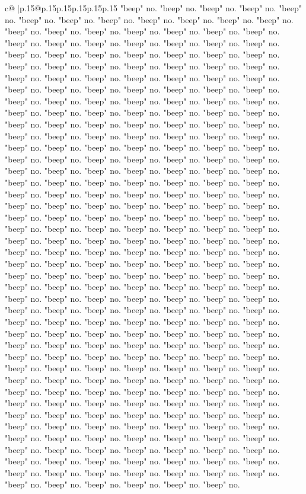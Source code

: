 \documentclass{article}
\begin{document}
{\begin{supertabular}{c@{$\;$}|p{.15\linewidth}@{}p{.15\linewidth}p{.15\linewidth}p{.15\linewidth}p{.15\linewidth}p{.15\linewidth}}
{{{"beep" no. "beep" no. "beep" no. "beep" no. "beep" no. "beep" no. "beep" no. "beep" no. "beep" no. "beep" no. "beep" no. "beep" no. "beep" no. "beep" no. "beep" no. "beep" no. "beep" no. "beep" no. "beep" no. "beep" no. "beep" no. "beep" no. "beep" no. "beep" no. "beep" no. "beep" no. "beep" no. "beep" no. "beep" no. "beep" no. "beep" no. "beep" no. "beep" no. "beep" no. "beep" no. "beep" no. "beep" no. "beep" no. "beep" no. "beep" no. "beep" no. "beep" no. "beep" no. "beep" no. "beep" no. "beep" no. "beep" no. "beep" no. "beep" no. "beep" no. "beep" no. "beep" no. "beep" no. "beep" no. "beep" no. "beep" no. "beep" no. "beep" no. "beep" no. "beep" no. "beep" no. "beep" no. "beep" no. "beep" no. "beep" no. "beep" no. "beep" no. "beep" no. "beep" no. "beep" no. "beep" no. "beep" no. "beep" no. "beep" no. "beep" no. "beep" no. "beep" no. "beep" no. "beep" no. "beep" no. "beep" no. "beep" no. "beep" no. "beep" no. "beep" no. "beep" no. "beep" no. "beep" no. "beep" no. "beep" no. "beep" no. "beep" no. "beep" no. "beep" no. "beep" no. "beep" no. "beep" no. "beep" no. "beep" no. "beep" no. "beep" no. "beep" no. "beep" no. "beep" no. "beep" no. "beep" no. "beep" no. "beep" no. "beep" no. "beep" no. "beep" no. "beep" no. "beep" no. "beep" no. "beep" no. "beep" no. "beep" no. "beep" no. "beep" no. "beep" no. "beep" no. "beep" no. "beep" no. "beep" no. "beep" no. "beep" no. "beep" no. "beep" no. "beep" no. "beep" no. "beep" no. "beep" no. "beep" no. "beep" no. "beep" no. "beep" no. "beep" no. "beep" no. "beep" no. "beep" no. "beep" no. "beep" no. "beep" no. "beep" no. "beep" no. "beep" no. "beep" no. "beep" no. "beep" no. "beep" no. "beep" no. "beep" no. "beep" no. "beep" no. "beep" no. "beep" no. "beep" no. "beep" no. "beep" no. "beep" no. "beep" no. "beep" no. "beep" no. "beep" no. "beep" no. "beep" no. "beep" no. "beep" no. "beep" no. "beep" no. "beep" no. "beep" no. "beep" no. "beep" no. "beep" no. "beep" no. "beep" no. "beep" no. "beep" no. "beep" no. "beep" no. "beep" no. "beep" no. "beep" no. "beep" no. "beep" no. "beep" no. "beep" no. "beep" no. "beep" no. "beep" no. "beep" no. "beep" no. "beep" no. "beep" no. "beep" no. "beep" no. "beep" no. "beep" no. "beep" no. "beep" no. "beep" no. "beep" no. "beep" no. "beep" no. "beep" no. "beep" no. "beep" no. "beep" no. "beep" no. "beep" no. "beep" no. "beep" no. "beep" no. "beep" no. "beep" no. "beep" no. "beep" no. "beep" no. "beep" no. "beep" no. "beep" no. "beep" no. "beep" no. "beep" no. "beep" no. "beep" no. "beep" no. "beep" no. "beep" no. "beep" no. "beep" no. "beep" no. "beep" no. "beep" no. "beep" no. "beep" no. "beep" no. "beep" no. "beep" no. "beep" no. "beep" no. "beep" no. "beep" no. "beep" no. "beep" no. "beep" no. "beep" no. "beep" no. "beep" no. "beep" no. "beep" no. "beep" no. "beep" no. "beep" no. "beep" no. "beep" no. "beep" no. "beep" no. "beep" no. "beep" no. "beep" no. "beep" no. "beep" no. "beep" no. "beep" no. "beep" no. "beep" no. "beep" no. "beep" no. "beep" no. "beep" no. "beep" no. "beep" no. "beep" no. "beep" no. "beep" no. "beep" no. "beep" no. "beep" no. "beep" no. "beep" no. "beep" no. "beep" no. "beep" no. "beep" no. "beep" no. "beep" no. "beep" no. "beep" no. "beep" no. }}}
\end{supertabular}}
\end{document}
